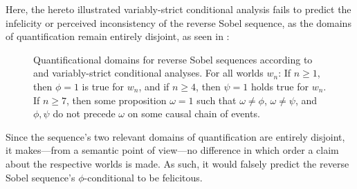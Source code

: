 Here, the hereto illustrated variably-strict conditional analysis fails to predict the infelicity or perceived inconsistency of the reverse Sobel sequence, as the domains of quantification remain entirely disjoint, as seen in :
\begin{figure}[!htb]

\caption{Quantificational domains for reverse Sobel sequences according to \textcite{Stalnaker1968} and  variably-strict conditional analyses. For all worlds $w_n$: If $n\geqslant1$, then $\phi=1$ is true for $w_n$, and if $n\geqslant 4$, then $\psi=1$ holds true for $w_n$. If $n\geqslant 7$, then some proposition $\omega=1$ such that $\omega\neq\phi$, $\omega\neq\psi$, and $\phi,\psi$ do not precede $\omega$ on some causal chain of events.}
\end{figure}

\noindent Since the sequence's two relevant domains of quantification are entirely disjoint, it makes---from a semantic point of view---no difference in which order a claim about the respective worlds is made. As such, it would falsely predict the reverse Sobel sequence's $\phi$-conditional to be felicitous.
